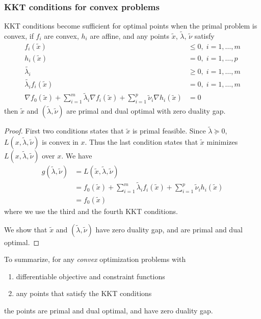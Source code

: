 \subsubsection{KKT conditions for convex problems}
KKT conditions become sufficient for optimal points when the primal problem is convex, \ie if $f_i$ are convex, $h_i$ are affine, and any points $\tilde{x}$, $\tilde{\lambda}$, $\tilde{\nu}$ satisfy
\begin{align*}
  f_i(\tilde{x})                  & \le 0,\;i=1,\dots,m\\
  h_i(\tilde{x})                  &   = 0,\;i=1,\dots,p\\
  \tilde{\lambda_i}               & \ge 0,\;i=1,\dots,m\\
  \tilde{\lambda_i} f_i(\tilde{x})&   = 0,\;i=1,\dots,m\\
  \nabla f_0(\tilde{x})+\sum_{i=1}^m\tilde{\lambda}_i\nabla f_i(\tilde{x})+\sum_{i=1}^p\tilde{\nu}_i\nabla h_i(\tilde{x})&=0
\end{align*}
then $\tilde{x}$ and $(\tilde{\lambda},\tilde{\nu})$ are primal and dual optimal with zero duality gap.
\begin{proof}
  First two conditions states that $\tilde{x}$ is primal feasible.
  Since $\tilde{\lambda}\succeq 0$, $L(x,\tilde{\lambda},\tilde{\nu})$ is convex in $x$.
  Thus the last condition states that $\tilde{x}$ minimizes $L(x,\tilde{\lambda},\tilde{\nu})$ over $x$.
  We have
  \begin{align*}
    g(\tilde{\lambda},\tilde{\nu})
      &= L(\tilde{x},\tilde{\lambda},\tilde{\nu})\\
      &= f_0(\tilde{x})+\sum_{i=1}^m\tilde{\lambda}_if_i(\tilde{x})+\sum_{i=1}^p\tilde{\nu}_ih_i(\tilde{x})\\
      &= f_0(\tilde{x})
  \end{align*}
  where we use the third and the fourth KKT conditions.\par
  We show that $\tilde{x}$ and $(\tilde{\lambda},\tilde{\nu})$ have zero duality gap, and are primal and dual optimal.
\end{proof}
\noindent To summarize, for any \textit{convex} optimization problems with
\begin{enumerate}
  \item differentiable objective and constraint functions
  \item any points that satisfy the KKT conditions
\end{enumerate}
the points are primal and dual optimal, and have zero duality gap.\par
